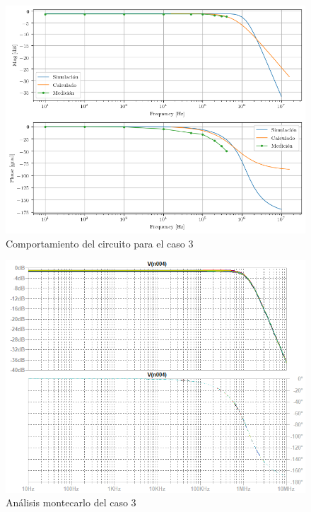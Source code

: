 \begin{figure}[H]
\begin{centering}
\includegraphics[scale=0.5]{../Ex1/iB/Resources1b/H3b}
\par\end{centering}
\caption{Comportamiento del circuito para el caso 3}
\end{figure}

\begin{figure}[H]
\begin{centering}
\includegraphics[scale=0.5]{../Ex1/iB/Resources1b/Montecarlo3}
\par\end{centering}
\caption{Análisis montecarlo del caso 3}
\end{figure}

